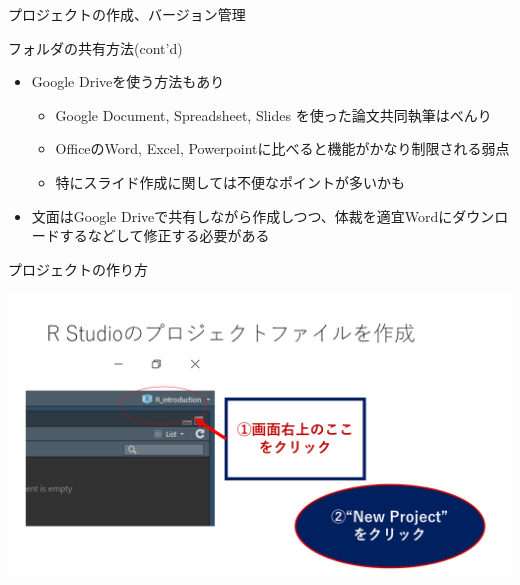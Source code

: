\documentclass[
  ignorenonframetext,
]{beamer}
\providecommand{\tightlist}{%
  \setlength{\itemsep}{0pt}\setlength{\parskip}{0pt}}
\begin{document}
\begin{frame}[fragile]{プロジェクトの作成、バージョン管理}
\begin{block}{フォルダの共有方法(cont'd)}
\protect\hypertarget{ux30d5ux30a9ux30ebux30c0ux306eux5171ux6709ux65b9ux6cd5contd}{}
\begin{itemize}
\tightlist
\item
  Google Driveを使う方法もあり

  \begin{itemize}
  \tightlist
  \item
    Google Document, Spreadsheet, Slides を使った論文共同執筆はべんり
  \item
    OfficeのWord, Excel, Powerpointに比べると機能がかなり制限される弱点
  \item
    特にスライド作成に関しては不便なポイントが多いかも
  \end{itemize}
\item
  文面はGoogle
  Driveで共有しながら作成しつつ、体裁を適宜Wordにダウンロードするなどして修正する必要がある
\end{itemize}
\end{block}

\begin{block}{プロジェクトの作り方}
\protect\hypertarget{ux30d7ux30edux30b8ux30a7ux30afux30c8ux306eux4f5cux308aux65b9}{}
\begin{center}\includegraphics[width=0.95\linewidth]{figs/create_repository} \end{center}
\end{block}


\end{frame}
\end{document}
